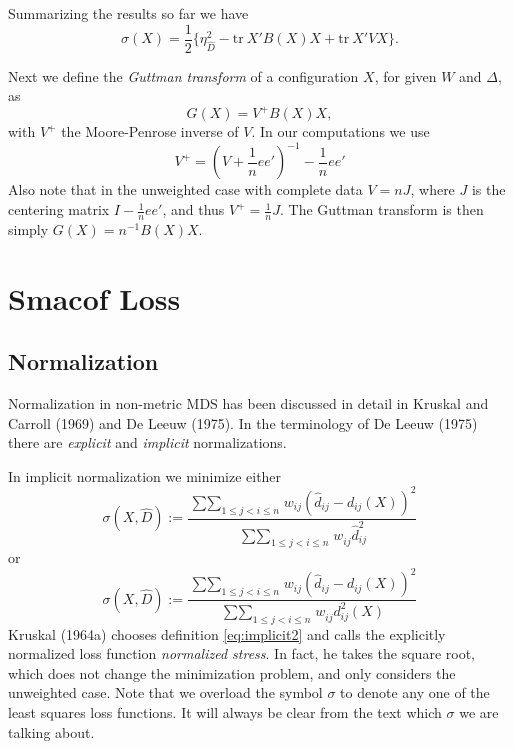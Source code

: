 \documentclass[
  12pt,
]{article}
\newcommand{\jis}{\mathop{\sum\sum}_{1\leq j<i\leq n}}
\begin{document}
Summarizing the results so far we have
\begin{equation}
\sigma(X)=\frac12\{\eta_{\hat D}^2-\text{tr}\ X'B(X)X+\text{tr}\ X'VX\}.
\label{eq:sigmat}
\end{equation}

Next we define the \emph{Guttman transform} of a configuration \(X\), for given \(W\) and
\(\Delta\), as
\begin{equation}
G(X)=V^+B(X)X,
\label{eq:gudef}
\end{equation}
with \(V^+\) the Moore-Penrose inverse of \(V\). In our computations we use
\[
V^+=(V+\frac{1}{n}ee')^{-1}-\frac{1}{n}ee'
\]
Also note that in the unweighted case with complete data
\(V=nJ\), where \(J\) is the centering matrix \(I-\frac{1}{n}ee'\), and thus
\(V^+=\frac{1}{n}J\). The Guttman transform is then simply \(G(X)=n^{-1}B(X)X\).

\section{Smacof Loss}\label{smacof-loss}

\subsection{Normalization}\label{normalization}

Normalization in non-metric MDS has been discussed in detail in
Kruskal and Carroll (1969) and De Leeuw (1975). In the terminology of
De Leeuw (1975) there are \emph{explicit} and \emph{implicit} normalizations.

In implicit normalization we minimize either
\begin{equation}
\sigma(X,\hat D):=\frac{\jis w_{ij}(\hat d_{ij} -d_{ij}(X))^2}{\jis w_{ij}^{\ }\hat d_{ij}^2}
\label{eq:implicit1}
\end{equation}
or
\begin{equation}
\sigma(X,\hat D):=\frac{\jis w_{ij}(\hat d_{ij}-d_{ij}(X))^2}{\jis w_{ij}^{\ }d_{ij}^2(X) }
\label{eq:implicit2}
\end{equation}
Kruskal (1964a) chooses definition \eqref{eq:implicit2} and calls the explicitly normalized
loss function \emph{normalized stress}. In fact, he takes the square root, which
does not change the minimization problem, and only considers the
unweighted case. Note that we overload the symbol \(\sigma\) to denote any one
of the least squares loss functions. It will always be clear from the
text which \(\sigma\) we are talking about.
\end{document}
